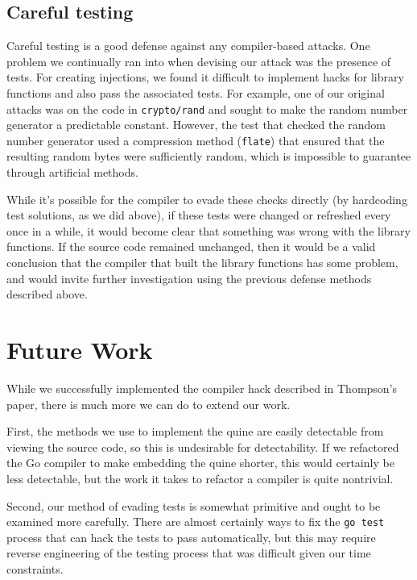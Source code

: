 \documentclass[10pt]{sigplanconf}
\begin{document}
\subsection{Careful testing}

Careful testing is a good defense against any compiler-based attacks. One problem we continually ran into when devising our attack was the presence of tests. For creating injections, we found it difficult to implement hacks for library functions and also pass the associated tests. For example, one of our original attacks was on the code in \texttt{crypto/rand} and sought to make the random number generator a predictable constant. However, the test that checked the random number generator used a compression method (\texttt{flate}) that ensured that the resulting random bytes were sufficiently random, which is impossible to guarantee through artificial methods.

\smallskip

While it's possible for the compiler to evade these checks directly (by hardcoding test solutions, as we did above), if these tests were changed or refreshed every once in a while, it would become clear that something was wrong with the library functions. If the source code remained unchanged, then it would be a valid conclusion that the compiler that built the library functions has some problem, and would invite further investigation using the previous defense methods described above.

\section{Future Work}
While we successfully implemented the compiler hack described in Thompson's paper, there is much more we can do to extend our work. 

\smallskip

First, the methods we use to implement the quine are easily detectable from viewing the source code, so this is undesirable for detectability. If we refactored the Go compiler to make embedding the quine shorter, this would certainly be less detectable, but the work it takes to refactor a compiler is quite nontrivial.

\smallskip

Second, our method of evading tests is somewhat primitive and ought to be examined more carefully. There are almost certainly ways to fix the \texttt{go test} process that can hack the tests to pass automatically, but this may require reverse engineering of the testing process that was difficult given our time constraints.
\end{document}
